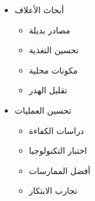 \begin{itemize}
\begin{itemize}
        \item أبحاث الأعلاف
        \begin{itemize}
            \item مصادر بديلة
            \item تحسين التغذية
            \item مكونات محلية
            \item تقليل الهدر
        \end{itemize}
        
        \item تحسين العمليات
        \begin{itemize}
            \item دراسات الكفاءة
            \item اختبار التكنولوجيا
            \item أفضل الممارسات
            \item تجارب الابتكار
        \end{itemize}
    \end{itemize}
\end{itemize}

